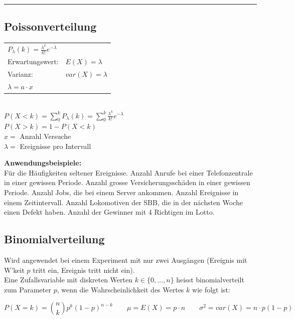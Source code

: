 \hrule \hspace{3mm}

	\subsection{Poissonverteilung }
	\begin{multicols}{2}
		\begin{tabular}{ll}
        $P_\lambda(k)=\frac{\lambda^k}{k!}e^{-\lambda}$ & \\
        Erwartungswert:  & $E(X)=\lambda$\\
        Varianz:  & $var(X)=\lambda$ \\
        $\lambda = a \cdot x$ \\
        \end{tabular} \\
         $P(X<k) = \sum_0^k P_\lambda(k)=\sum_0^k \frac{\lambda^k}{k!}e^{-\lambda}$ \\
         $P(X>k) = 1-P(X<k)$ \\
        $x =$ Anzahl Versuche\\
        $\lambda =$ Ereignisse pro Intervall
        \columnbreak
        
        {\bf Anwendungsbeispiele:} \\ Für die Häufigkeiten seltener
        Ereignisse. Anzahl Anrufe bei einer Telefonzentrale in einer gewissen
        Periode. Anzahl grosse Versicherungsschäden in einer gewissen Periode.
        Anzahl Jobs, die bei einem Server ankommen. Anzahl Ereignisse in
        einem Zeitintervall. Anzahl Lokomotiven der SBB, die in der nächsten Woche 
        einen Defekt haben. Anzahl der Gewinner mit 4 Richtigen im Lotto.
     \end{multicols}
        
\newpage
	\subsection{Binomialverteilung }
		
    	Wird angewendet bei einem Experiment mit nur zwei Ausgängen (Ereignis mit W'keit $p$ tritt
    	ein, Ereignis tritt nicht ein). \\
    	Eine Zufallsvariable mit diskreten Werten $k \in \{
    	0,\ldots,n \}$ heisst binomialverteilt zum Parameter $p$, wenn die
        Wahrscheinlichkeit des Wertes $k$ wie folgt ist:

      $$P(X=k) = \binom n k p^k(1-p)^{n-k} \qquad \mu = E(X) = p \cdot n \qquad \sigma^2 =
      var(X) = n \cdot p (1-p)$$


